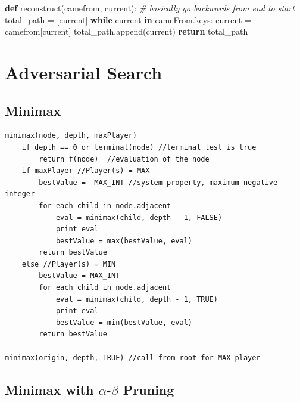 \documentclass[11pt]{article}
\newenvironment{Shaded}{}{}
\newcommand{\KeywordTok}[1]{\textcolor[rgb]{0.00,0.44,0.13}{\textbf{{#1}}}}
\newcommand{\CommentTok}[1]{\textcolor[rgb]{0.38,0.63,0.69}{\textit{{#1}}}}
\newcommand{\NormalTok}[1]{{#1}}
\newcommand{\ControlFlowTok}[1]{\textcolor[rgb]{0.00,0.44,0.13}{\textbf{{#1}}}}
\newcommand{\OperatorTok}[1]{\textcolor[rgb]{0.40,0.40,0.40}{{#1}}}
\begin{document}
\begin{Shaded}
\begin{Highlighting}[]
\KeywordTok{def} \NormalTok{reconstruct(camefrom, current):}
  \CommentTok{# basically go backwards from end to start}
  \NormalTok{total_path }\OperatorTok{=} \NormalTok{[current]}
  \ControlFlowTok{while} \NormalTok{current }\KeywordTok{in} \NormalTok{cameFrom.keys:}
    \NormalTok{current }\OperatorTok{=} \NormalTok{camefrom[current]}
    \NormalTok{total_path.append(current)}
  \ControlFlowTok{return} \NormalTok{total_path}
\end{Highlighting}
\end{Shaded}

    \section{Adversarial Search}\label{adversarial-search}

    \subsection{Minimax}\label{minimax}

\begin{verbatim}
minimax(node, depth, maxPlayer)
    if depth == 0 or terminal(node) //terminal test is true
        return f(node)  //evaluation of the node
    if maxPlayer //Player(s) = MAX
        bestValue = -MAX_INT //system property, maximum negative integer
        for each child in node.adjacent
            eval = minimax(child, depth - 1, FALSE)
            print eval
            bestValue = max(bestValue, eval)
        return bestValue
    else //Player(s) = MIN
        bestValue = MAX_INT
        for each child in node.adjacent
            eval = minimax(child, depth - 1, TRUE)
            print eval
            bestValue = min(bestValue, eval)
        return bestValue

minimax(origin, depth, TRUE) //call from root for MAX player
\end{verbatim}

    \subsection{\texorpdfstring{Minimax with \(\alpha\)-\(\beta\)
Pruning}{Minimax with \textbackslash{}alpha-\textbackslash{}beta Pruning}}\label{minimax-with-alpha-beta-pruning}
\end{document}
